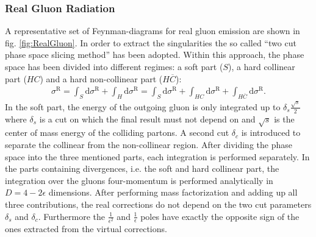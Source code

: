 \subsubsection{Real Gluon Radiation}\label{sec:RealGluonRad}
A representative set of Feynman-diagrams for real gluon emission are shown in fig. \ref{fig:RealGluon}. In order to extract the singularities the so called ``two cut phase space slicing method''\cite{Harris:2001sx} has been adopted. Within this approach, the phase space has been divided into different regimes: a soft part ($S$), a hard collinear part ($HC$) and a hard non-collinear part ($H\overline{C}$):
\begin{align}
\sigma^{\mathrm{R}} = \int_S \mathrm{d}\sigma^{\mathrm{R}} + \int_H \mathrm{d}\sigma^{\mathrm{R}} = \int_S \mathrm{d}\sigma^{\mathrm{R}} + \int_{HC} \mathrm{d}\sigma^{\mathrm{R}} + \int_{H\overline{C}}\mathrm{d} \sigma^{\mathrm{R}}.
\end{align}
In the soft part, the energy of the outgoing gluon is only integrated up to  $\delta_s \frac{\sqrt{s}}{2}$ where $\delta_s$ is a cut on which the final result must not depend on and $\sqrt{s}$ is the center of mass energy of the colliding partons. A second cut $\delta_c$ is introduced to separate the collinear from the non-collinear region. After dividing the phase space into the three mentioned parts, each integration is performed separately. In the parts containing divergences, i.e. the soft and hard collinear part, the integration over the gluons four-momentum is performed analytically in $D = 4 - 2\epsilon$ dimensions. After performing mass factorization and adding up all three contributions, the real corrections do not depend on the two cut parameters $\delta_s$ and $\delta_c$. Furthermore the $\frac{1}{\epsilon^2}$ and $\frac{1}{\epsilon}$ poles have exactly the opposite sign of the ones extracted from the virtual corrections.



